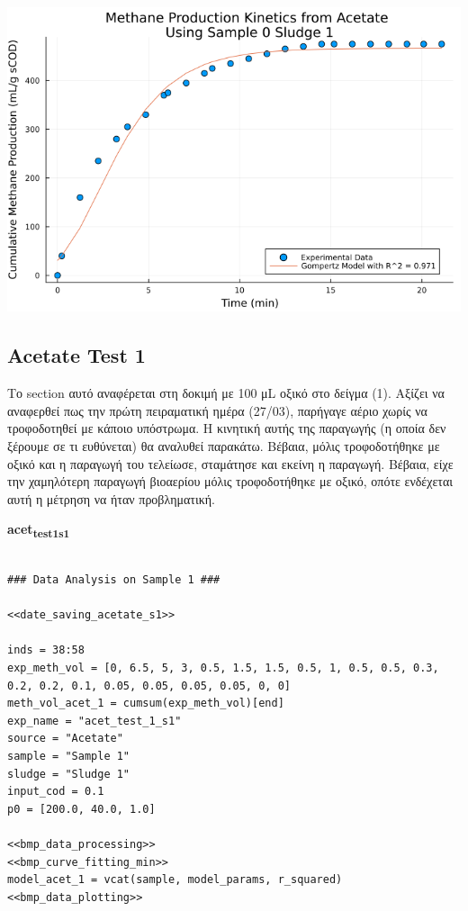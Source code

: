 \documentclass[11pt]{article}
\begin{document}
\begin{center}
\includegraphics[width=.9\linewidth]{../plots/BMPs/Acetate/methane_kinetics_acet_test_0_s1.png}
\end{center}

\subsection{Acetate Test 1}
\label{sec:orgcbb4c78}
Το section αυτό αναφέρεται στη δοκιμή με 100 μL οξικό στο δείγμα (1). Aξίζει να αναφερθεί πως την πρώτη πειραματική ημέρα (27/03), παρήγαγε αέριο χωρίς να τροφοδοτηθεί με κάποιο υπόστρωμα. Η κινητική αυτής της παραγωγής (η οποία δεν ξέρουμε σε τι ευθύνεται) θα αναλυθεί παρακάτω. Βέβαια, μόλις τροφοδοτήθηκε με οξικό και η παραγωγή του τελείωσε, σταμάτησε και εκείνη η παραγωγή. Βέβαια, είχε την χαμηλότερη παραγωγή βιοαερίου μόλις τροφοδοτήθηκε με οξικό, οπότε ενδέχεται αυτή η μέτρηση να ήταν προβληματική.

\textbf{acet\textsubscript{test}\textsubscript{1}\textsubscript{s1}}
\begin{verbatim}

### Data Analysis on Sample 1 ###

<<date_saving_acetate_s1>>

inds = 38:58
exp_meth_vol = [0, 6.5, 5, 3, 0.5, 1.5, 1.5, 0.5, 1, 0.5, 0.5, 0.3, 0.2, 0.2, 0.1, 0.05, 0.05, 0.05, 0.05, 0, 0]
meth_vol_acet_1 = cumsum(exp_meth_vol)[end]
exp_name = "acet_test_1_s1"
source = "Acetate"
sample = "Sample 1"
sludge = "Sludge 1"
input_cod = 0.1
p0 = [200.0, 40.0, 1.0]

<<bmp_data_processing>>
<<bmp_curve_fitting_min>>
model_acet_1 = vcat(sample, model_params, r_squared)
<<bmp_data_plotting>>
\end{verbatim}
\end{document}
